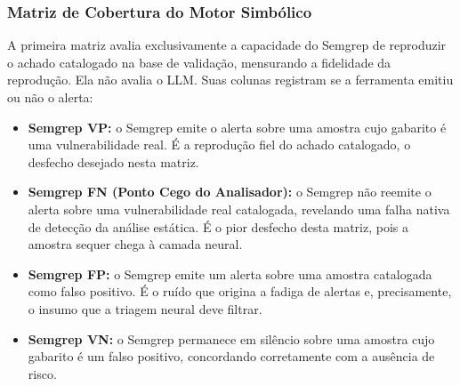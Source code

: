 \subsubsection{Matriz de Cobertura do Motor Simbólico}
A primeira matriz avalia exclusivamente a capacidade do Semgrep de reproduzir o achado catalogado na base de validação, mensurando a fidelidade da reprodução. Ela não avalia o LLM. Suas colunas registram se a ferramenta emitiu ou não o alerta:
\begin{itemize}
\item \textbf{Semgrep VP:} o Semgrep emite o alerta sobre uma amostra cujo gabarito é uma vulnerabilidade real. É a reprodução fiel do achado catalogado, o desfecho desejado nesta matriz.
\item \textbf{Semgrep FN (Ponto Cego do Analisador):} o Semgrep não reemite o alerta sobre uma vulnerabilidade real catalogada, revelando uma falha nativa de detecção da análise estática. É o pior desfecho desta matriz, pois a amostra sequer chega à camada neural.
\item \textbf{Semgrep FP:} o Semgrep emite um alerta sobre uma amostra catalogada como falso positivo. É o ruído que origina a fadiga de alertas e, precisamente, o insumo que a triagem neural deve filtrar.
\item \textbf{Semgrep VN:} o Semgrep permanece em silêncio sobre uma amostra cujo gabarito é um falso positivo, concordando corretamente com a ausência de risco.
\end{itemize}

